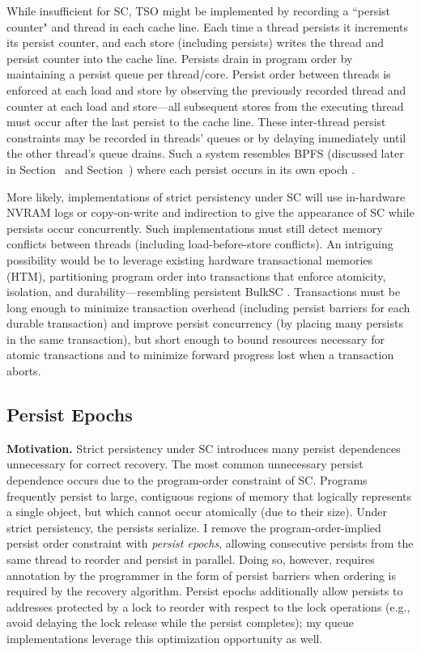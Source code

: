 While insufficient for SC, TSO might be implemented by recording a ``persist counter" and thread in each cache line.
Each time a thread persists it increments its persist counter, and each store (including persists) writes the thread and persist counter into the cache line.
Persists drain in program order by maintaining a persist queue per thread/core.
Persist order between threads is enforced at each load and store by observing the previously recorded thread and counter at each load and store---all subsequent stores from the executing thread must occur after the last persist to the cache line.
These inter-thread persist constraints may be recorded in threads' queues or by delaying immediately until the other thread's queue drains.
Such a system resembles BPFS (discussed later in Section~ and Section~) where each persist occurs in its own epoch \cite{Condit09}.

More likely, implementations of strict persistency under SC will use in-hardware NVRAM logs or copy-on-write and indirection to give the appearance of SC while persists occur concurrently.
Such implementations must still detect memory conflicts between threads (including load-before-store conflicts).
An intriguing possibility would be to leverage existing hardware transactional memories (HTM), partitioning program order into transactions that enforce atomicity, isolation, and durability---resembling persistent BulkSC .
Transactions must be long enough to minimize transaction overhead (including persist barriers for each durable transaction) and improve persist concurrency (by placing many persists in the same transaction), but short enough to bound resources necessary for atomic transactions and to minimize forward progress lost when a transaction aborts.

\subsection{Persist Epochs}
\label{section:PersistencyModels:PersistEpochs}

\textbf{Motivation.}
Strict persistency under SC introduces many persist dependences unnecessary for correct recovery.
The most common unnecessary persist dependence occurs due to the program-order constraint of SC.
Programs frequently persist to large, contiguous regions of memory that logically represents a single object, but which cannot occur atomically (due to their size).
Under strict persistency, the persists serialize.
I remove the program-order-implied persist order constraint with \emph{persist epochs}, allowing consecutive persists from the same thread to reorder and persist in parallel.
Doing so, however, requires annotation by the programmer in the form of persist barriers when ordering is required by the recovery algorithm.
Persist epochs additionally allow persists to addresses protected by a lock to reorder with respect to the lock operations (e.g., avoid delaying the lock release while the persist completes); my queue implementations leverage this optimization opportunity as well.


